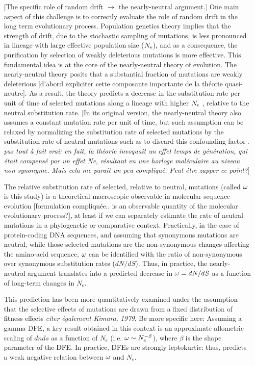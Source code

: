 \documentclass{article}
\begin{document}
	[The specific role of random drift $\to$ the nearly-neutral argument.]
	One main aspect of this challenge is to correctly evaluate the role of random drift in the long term evolutionary process.
	Population genetics theory implies that the strength of drift, due to the stochastic sampling of mutations, is less pronounced in lineage with large effective population size ($N_{\mathrm{e}}$), and as a consequence, the purification by selection of weakly deleterious mutations is more effective.
	This fundamental idea is at the core of the nearly-neutral theory of evolution.
	The nearly-neutral theory posits that a substantial fraction of mutations are weakly deleterious [d'abord expliciter cette composante importante de la théorie quasi-neutre].
	As a result, the theory predicts a decrease in the substitution rate per unit of time of selected mutations along a lineage with higher $N_{\mathrm{e}}$ \cite{Ohta1972, Ohta1992}, relative to the neutral substitution rate.
	[In its original version, the nearly-neutral theory also assumes a constant mutation rate per unit of time, but such assumption can be relaxed by normalizing the substitution rate of selected mutations by the substitution rate of neutral mutations such as to discard this confounding factor \cite{Ohta1972}. {\it pas tout à fait vrai: en fait, la théorie invoquait un effet temps de génération, qui était compensé par un effet Ne, résultant en une horloge moléculaire au niveau non-synonyme. Mais cela me parait un peu compliqué. Peut-être zapper ce point?}]
	
	The relative substitution rate of selected, relative to neutral, mutations (called $\omega$ is this study) is a theoretical macroscopic observable in molecular sequence evolution [formulation compliquée.. is an observable quantity of the molecular evolutionary process?], at least if we can separately estimate the rate of neutral mutations in a phylogenetic or comparative context. Practically, in the case of protein-coding DNA sequences, and assuming that synonymous mutations are neutral, while those selected mutations are the non-synonymous changes affecting the amino-acid sequence, $\omega$ can be identified with the ratio of non-synonymous over synonymous substitution rates ($dN/dS$). Thus, in practice, the nearly-neutral argument translates into a predicted decrease in $\omega =  dN/dS$ as a function of long-term changes in $N_e$.
	
	This prediction has been more quantitatively examined under the assumption that the selective effects of mutations are drawn from a fixed distribution of fitness effects \cite{Welch2008} {\it citer également Kimura, 1979}. Be more specific here: Assuming a gamma DFE, a key result obtained in this context is an approximate allometric scaling of $dnds$ as a function of $N_e$ (i.e. $\omega \sim N_e^{-\beta}$), where $\beta$ is the shape parameter of the DFE. In practice, DFEs are strongly leptokurtic: thus, predicts a weak negative relation between $\omega$ and $N_e$.
	
\end{document}
